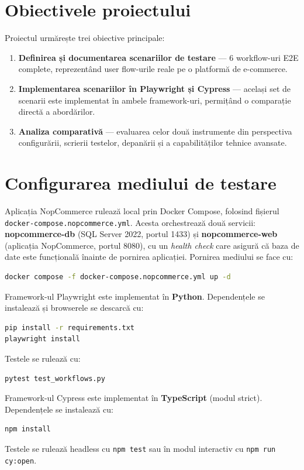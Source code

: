 \section{Obiectivele proiectului}

Proiectul urmărește trei obiective principale:

\begin{enumerate}
    \item \textbf{Definirea și documentarea scenariilor de testare} --- 6 workflow-uri E2E
          complete, reprezentând user flow-urile reale pe o platformă
          de e-commerce.
    \item \textbf{Implementarea scenariilor în Playwright și Cypress} --- același set de
          scenarii este implementat în ambele framework-uri, permițând o comparație directă
          a abordărilor.
    \item \textbf{Analiza comparativă} --- evaluarea celor două instrumente din perspectiva
          configurării, scrierii testelor, depanării și a capabilităților tehnice avansate.
\end{enumerate}

\section{Configurarea mediului de testare}

Aplicația NopCommerce rulează local prin Docker Compose, folosind fișierul
\texttt{docker-compose.nopcommerce.yml}. Acesta orchestrează două servicii:
\textbf{nopcommerce-db} (SQL Server 2022, portul 1433) și \textbf{nopcommerce-web}
(aplicația NopCommerce, portul 8080), cu un \textit{health check} care asigură că
baza de date este funcțională înainte de pornirea aplicației. Pornirea mediului se
face cu:

\begin{lstlisting}[language=bash]
docker compose -f docker-compose.nopcommerce.yml up -d
\end{lstlisting}

Framework-ul Playwright este implementat în \textbf{Python}. Dependențele se instalează
și browserele se descarcă cu:

\begin{lstlisting}[language=bash]
pip install -r requirements.txt
playwright install
\end{lstlisting}

Testele se rulează cu:

\begin{lstlisting}[language=bash]
pytest test_workflows.py
\end{lstlisting}

Framework-ul Cypress este implementat în \textbf{TypeScript} (modul strict). Dependențele
se instalează cu:

\begin{lstlisting}[language=bash]
npm install
\end{lstlisting}

Testele se rulează headless cu \texttt{npm test} sau în modul interactiv cu
\texttt{npm run cy:open}.

